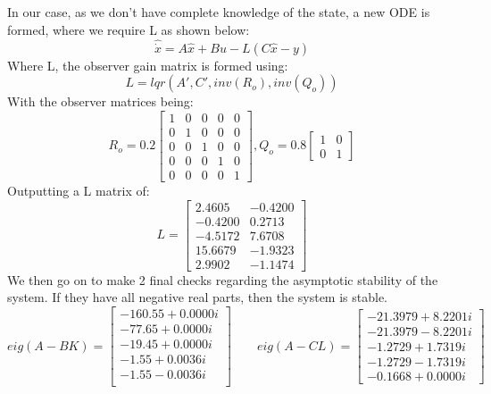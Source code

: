 \documentclass[12pt]{article}
\begin{document}
In our case, as we don't have complete knowledge of the state, a new ODE is formed, where we require L as shown below:
\begin{equation}
    \hat{\dot{x}} = A\hat{x} + Bu - L(C\hat{x} - y)
\end{equation}
Where L, the observer gain matrix is formed using:
\begin{equation}
    L = lqr(A',C',inv(R_{o}),inv(Q_{o}))
\end{equation}
With the observer matrices being:
\begin{equation*}
    R_{o}= 0.2\begin{bmatrix}
    1 & 0 & 0 & 0 & 0\\
    0 & 1 & 0 & 0 & 0\\
    0 & 0 & 1 & 0 & 0\\
    0 & 0 & 0 & 1 & 0\\
    0 & 0 & 0 & 0 & 1
    \end{bmatrix} , Q_{o} = 0.8\begin{bmatrix}
    1 & 0 \\ 0 & 1
    \end{bmatrix}
\end{equation*}
Outputting a L matrix of:
\begin{equation}
    L = \begin{bmatrix}
    2.4605  & -0.4200\\
   -0.4200  &  0.2713\\
   -4.5172  &  7.6708\\
   15.6679  & -1.9323\\
    2.9902  & -1.1474

    \end{bmatrix}
\end{equation}
We then go on to make 2 final checks regarding the asymptotic stability of the system. If they have all negative real parts, then the system is stable.
\begin{equation}
    eig(A-BK) = \begin{bmatrix}
-160.55+0.0000i\\
-77.65+0.0000i\\
-19.45+0.0000i\\
-1.55+0.0036i\\
-1.55-0.0036i\\
    \end{bmatrix} \qquad eig(A-CL) = \begin{bmatrix}
-21.3979 + 8.2201i\\
 -21.3979 - 8.2201i\\
  -1.2729 + 1.7319i\\
  -1.2729 - 1.7319i\\
  -0.1668 + 0.0000i
    \end{bmatrix}
\end{equation}
\end{document}
